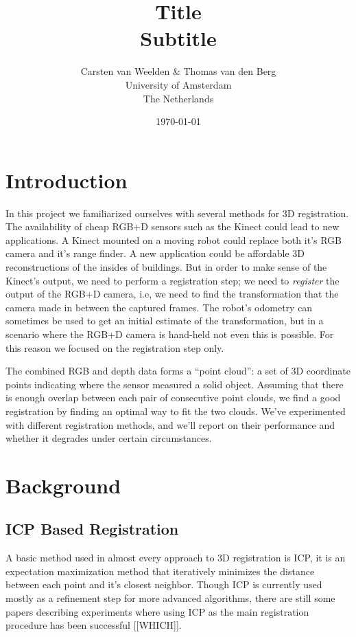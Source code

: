 \documentclass[a4paper]{article}
\title{Title\\
{\large Subtitle}}
\author{Carsten van Weelden \& Thomas van den Berg\\
  University of Amsterdam\\
  The Netherlands}
\date{\today}
\begin{document}
\maketitle



\section{Introduction}

In this project we familiarized ourselves with several methods for 3D registration. The availability of cheap RGB+D sensors such as the Kinect could lead to new applications. A Kinect mounted on a moving robot could replace both it's RGB camera and it's range finder. A new application could be affordable 3D reconstructions of the insides of buildings. But in order to make sense of the Kinect's output, we need to perform a registration step; we need to \emph{register} the output of the RGB+D camera, i.e, we need to find the transformation that the camera made in between the captured frames. The robot's odometry can sometimes be used to get an initial estimate of the transformation, but in a scenario where the RGB+D camera is hand-held not even this is possible. For this reason we focused on the registration step only. 

The combined RGB and depth data forms a ``point cloud'': a set of 3D coordinate points indicating where the sensor measured a solid object. Assuming that there is enough overlap between each pair of consecutive point clouds, we find a good registration by finding an optimal way to fit the two clouds. We've experimented with different registration methods, and we'll report on their performance and whether it degrades under certain circumstances.

\section{Background}

\subsection{ICP Based Registration}

A basic method used in almost every approach to 3D registration is \ac{ICP}\cite{besl1992method}, it is an expectation maximization method that iteratively minimizes the distance between each point and it's closest neighbor. Though \ac{ICP} is currently used mostly as a refinement step for more advanced algorithms, there are still some papers describing experiments where using \ac{ICP} as the main registration procedure has been successful [[WHICH]]. 
\end{document}
